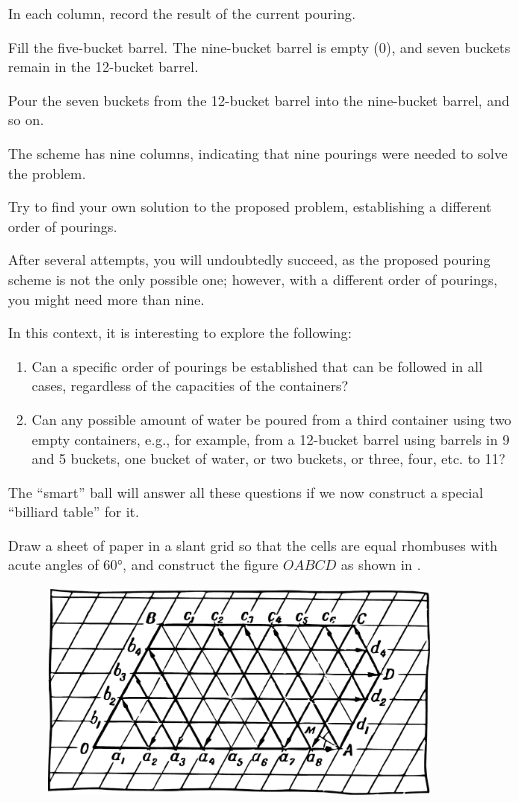 
In each column, record the result of the current pouring. 

Fill the five-bucket barrel. The nine-bucket barrel is empty (0), and seven buckets remain in the 12-bucket barrel. 

Pour the seven buckets from the 12-bucket barrel into the nine-bucket barrel, and so on.

The scheme has nine columns, indicating that nine pourings were needed to solve the problem.

Try to find your own solution to the proposed problem, establishing a different order of pourings.

After several attempts, you will undoubtedly succeed, as the proposed pouring scheme is not the only possible one; however, with a different order of pourings, you might need more than nine.

In this context, it is interesting to explore the following:
\begin{enumerate}
\item Can a specific order of pourings be established that can be followed in all cases, regardless of the capacities of the containers?
\item Can any possible amount of water be poured from a third container using two empty containers, e.g., for example, from a 12-bucket barrel using barrels in 9 and 5 buckets, one bucket of water, or two buckets, or three, four, etc. to 11?
\end{enumerate}

The ``smart'' ball will answer all these questions if we now construct a special ``billiard table'' for it.

Draw a sheet of paper in a slant grid so that the cells are equal rhombuses with acute angles of \ang{60}, and construct the figure $OABCD$ as shown in .



\begin{figure}[h!]
\centering
\includegraphics[width=0.9\textwidth]{figures/ch-10/fig-152.pdf}
\end{figure}


